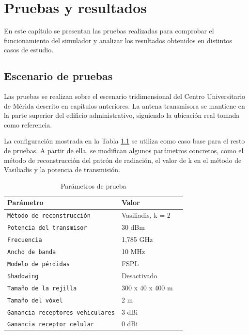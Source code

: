 \chapter{Pruebas y resultados}
\label{chap:pruebas_y_resultados}

En este capítulo se presentan las pruebas realizadas para comprobar el funcionamiento del simulador y analizar los resultados obtenidos en distintos casos de estudio.


\section{Escenario de pruebas}

Las pruebas se realizan sobre el escenario tridimensional del Centro Universitario de Mérida descrito en capítulos anteriores. La antena transmisora se mantiene en la parte superior del edificio administrativo, siguiendo la ubicación real tomada como referencia.

La configuración mostrada en la Tabla \ref{tab:parametros} se utiliza como caso base para el resto de pruebas. A partir de ella, se modifican algunos parámetros concretos, como el método de reconstrucción del patrón de radiación, el valor de k en el método de Vasiliadis y la potencia de transmisión.

\begin{table}[H]
    \centering
    \begin{tabularx}{\textwidth}{@{}llX@{}}
        \toprule
        \textbf{Parámetro} & \textbf{Valor}\\
        \midrule
        \texttt{Método de reconstrucción} & Vasiliadis, k = 2 \\
        \texttt{Potencia del transmisor} & 30 dBm \\
        \texttt{Frecuencia} & 1,785 GHz \\
        \texttt{Ancho de banda} & 10 MHz \\
        \texttt{Modelo de pérdidas} & FSPL \\
        \texttt{Shadowing} & Desactivado \\
        \texttt{Tamaño de la rejilla} & 300 x 40 x 400 m \\
        \texttt{Tamaño del vóxel} & 2 m \\
        \texttt{Ganancia receptores vehiculares} & 3 dBi \\
        \texttt{Ganancia receptor celular} & 0 dBi \\
        \bottomrule
    \end{tabularx}
    \caption{Parámetros de prueba}
    \label{tab:parametros}
\end{table}


